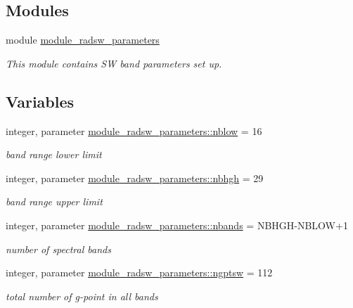 \subsection*{Modules}
\begin{DoxyCompactItemize}
\item 
module \hyperlink{namespacemodule__radsw__parameters}{module\+\_\+radsw\+\_\+parameters}
\begin{DoxyCompactList}\small\item\em This module contains SW band parameters set up. \end{DoxyCompactList}\end{DoxyCompactItemize}
\subsection*{Variables}
\begin{DoxyCompactItemize}
\item 
integer, parameter \hyperlink{namespacemodule__radsw__parameters_a2c5efc91f02dc0d4bdbd5e490f44c19c}{module\+\_\+radsw\+\_\+parameters\+::nblow} = 16
\begin{DoxyCompactList}\small\item\em band range lower limit \end{DoxyCompactList}\item 
integer, parameter \hyperlink{namespacemodule__radsw__parameters_a39e5ca4fd5defbc2545ee39bbf50d61b}{module\+\_\+radsw\+\_\+parameters\+::nbhgh} = 29
\begin{DoxyCompactList}\small\item\em band range upper limit \end{DoxyCompactList}\item 
integer, parameter \hyperlink{namespacemodule__radsw__parameters_a8f97b7698e8e5e2aec6e463fd09255cc}{module\+\_\+radsw\+\_\+parameters\+::nbands} = N\+B\+H\+GH-\/N\+B\+L\+OW+1
\begin{DoxyCompactList}\small\item\em number of spectral bands \end{DoxyCompactList}\item 
integer, parameter \hyperlink{namespacemodule__radsw__parameters_adc3e4d5a848d50e2883e05c62f61bc97}{module\+\_\+radsw\+\_\+parameters\+::ngptsw} = 112
\begin{DoxyCompactList}\small\item\em total number of g-\/point in all bands \end{DoxyCompactList}\item 

\end{DoxyCompactItemize}
